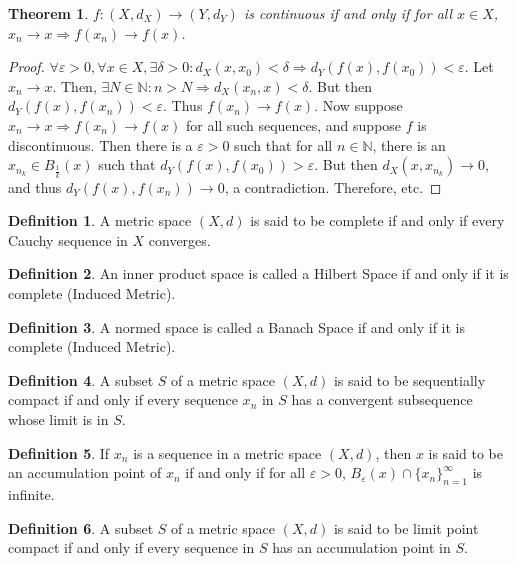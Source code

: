 \documentclass[oneside]{book}
\newtheorem{theorem}{Theorem}[section]
\theoremstyle{definition}
\newtheorem{definition}{Definition}[section]
\begin{document}
\begin{theorem}
$f:(X,d_X)\rightarrow (Y,d_Y)$ is continuous if and only if for all $x\in X$, $x_n\rightarrow x \Rightarrow f(x_n)\rightarrow f(x)$.
\end{theorem}
\begin{proof}
$\forall \varepsilon>0,\forall x\in X,\exists \delta>0:d_X(x,x_0)<\delta \Rightarrow d_Y(f(x),f(x_0))<\varepsilon$. Let $x_n \rightarrow x$. Then, $\exists N\in \mathbb{N}:n>N \Rightarrow d_X(x_n,x)<\delta$. But then $d_Y(f(x),f(x_n)) < \varepsilon$. Thus $f(x_n)\rightarrow f(x)$. Now suppose $x_n\rightarrow x \Rightarrow f(x_n)\rightarrow f(x)$ for all such sequences, and suppose $f$ is discontinuous. Then there is a $\varepsilon>0$ such that for all $n\in \mathbb{N}$, there is an $x_{n_k} \in B_{\frac{1}{k}}(x)$ such that $d_Y(f(x),f(x_0))>\varepsilon$. But then $d_X(x,x_{n_k})\rightarrow 0$, and thus $d_Y(f(x),f(x_n))\rightarrow 0$, a contradiction. Therefore, etc.
\end{proof}

\begin{definition}
A metric space $(X,d)$ is said to be complete if and only if every Cauchy sequence in $X$ converges.
\end{definition}

\begin{definition}
An inner product space is called a Hilbert Space if and only if it is complete (Induced Metric).
\end{definition}

\begin{definition}
A normed space is called a Banach Space if and only if it is complete (Induced Metric).
\end{definition}

\begin{definition}
A subset $S$ of a metric space $(X,d)$ is said to be sequentially compact if and only if every sequence $x_n$ in $S$ has a convergent subsequence whose limit is in $S$.
\end{definition}

\begin{definition}
If $x_n$ is a sequence in a metric space $(X,d)$, then $x$ is said to be an accumulation point of $x_n$ if and only if for all $\varepsilon>0$, $B_{\varepsilon}(x)\cap \{x_n\}_{n=1}^{\infty}$ is infinite.
\end{definition}

\begin{definition}
A subset $S$ of a metric space $(X,d)$ is said to be limit point compact if and only if every sequence in $S$ has an accumulation point in $S$.
\end{definition}
\end{document}
